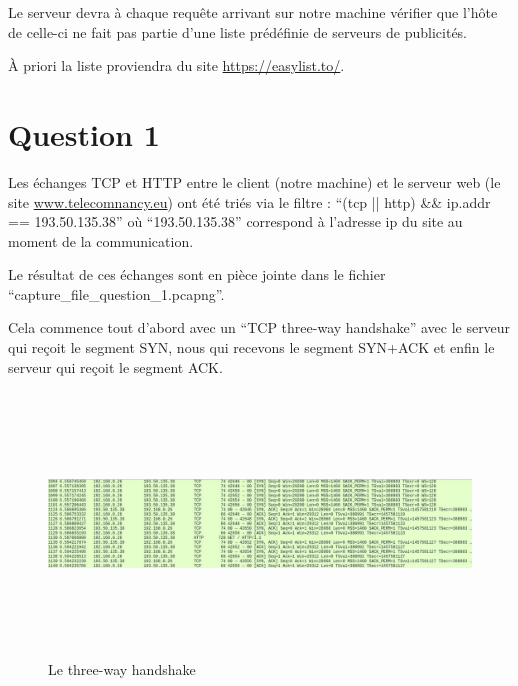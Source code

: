 \documentclass[12 pt,a4paper,french]{article}
\begin{document}
Le serveur devra à chaque requête arrivant sur notre machine vérifier que l'hôte de celle-ci ne fait pas partie d'une liste prédéfinie de serveurs de publicités.\\\par

À priori la liste proviendra du site \url{https://easylist.to/}.

\section{Question 1}

\hspace{5mm}Les échanges TCP et HTTP entre le client (notre machine) et le serveur web (le site \url{www.telecomnancy.eu}) ont été triés via le filtre : ``(tcp || http) \&\& ip.addr == 193.50.135.38'' où ``193.50.135.38'' correspond à l'adresse ip du site au moment de la communication.\\\par

Le résultat de ces échanges sont en pièce jointe dans le fichier ``capture\_file\_question\_1.pcapng''.\\\par

Cela commence tout d'abord avec un \textcite{1}``TCP three-way handshake'' avec le serveur qui reçoit le segment SYN, nous qui recevons le segment SYN+ACK et enfin le serveur qui reçoit le segment ACK.

\begin{figure}
  \includegraphics[height=7cm,width=20cm]{three_way_handshake.jpg}
  \caption{Le three-way handshake}
\end{figure}
\printbibliography
\end{document}
